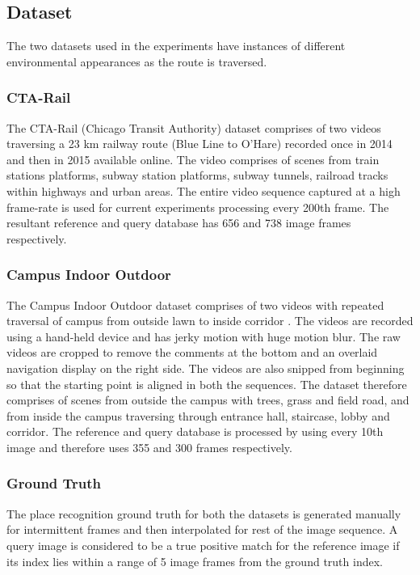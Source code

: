\documentclass[twocolumn]{article}
\begin{document}
\subsection{Dataset}
The two datasets used in the experiments have instances of different environmental appearances as the route is traversed.

\subsubsection{CTA-Rail}
The CTA-Rail (Chicago Transit Authority) dataset comprises of two videos traversing a 23 km railway route (Blue Line to O'Hare) recorded once in 2014\cite {ctaRail2014} and then in 2015 \cite{ctaRail2015} available online. The video comprises of scenes from train stations platforms, subway station platforms, subway tunnels, railroad tracks within highways and urban areas. The entire video sequence captured at a high frame-rate is used for current experiments processing every 200th frame. The resultant reference and query database has 656 and 738 image frames respectively.

\subsubsection{Campus Indoor Outdoor}
The Campus Indoor Outdoor dataset comprises of two videos with repeated traversal of campus from outside lawn to inside corridor \cite{indoorOutdoor1,indoorOutdoor2}. The videos are recorded using a hand-held device and has jerky motion with huge motion blur. The raw videos are cropped to remove the comments at the bottom and an overlaid navigation display on the right side. The videos are also snipped from beginning so that the starting point is aligned in both the sequences. The dataset therefore comprises of scenes from outside the campus with trees, grass and field road, and from inside the campus traversing through entrance hall, staircase, lobby and corridor. The reference and query database is processed by using every 10th image and therefore uses 355 and 300 frames respectively.

\subsubsection{Ground Truth}
The place recognition ground truth for both the datasets is generated manually for intermittent frames and then interpolated for rest of the image sequence. A query image is considered to be a true positive match for the reference image if its index lies within a range of 5 image frames from the ground truth index.
\end{document}
